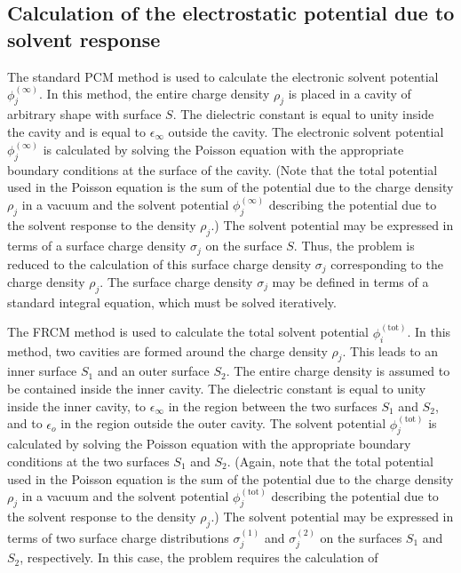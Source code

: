 \documentclass[oneside,11pt,openany]{book}
\begin{document}
\subsection*{Calculation of the electrostatic potential due to solvent response}
%
The standard PCM method is used to calculate the
electronic solvent potential $\phi_j^{(\infty)}$.
In this method,
the entire charge density $\rho_j$ is placed in a
cavity of arbitrary shape with surface $S$.
The dielectric
constant is equal to unity
inside the cavity and is equal to $\epsilon_\infty$
outside the cavity.
The electronic solvent potential $\phi_j^{(\infty)}$ is calculated by solving
the Poisson equation
with the appropriate boundary conditions at the surface of the
cavity.
(Note that the total potential used in the Poisson
equation is the sum of the potential
due to the charge density $\rho_j$ in a vacuum
and the solvent potential $\phi_j^{(\infty)}$ describing 
the potential due to the solvent response to the density $\rho_j$.)
The solvent potential 
may be expressed in terms of a surface charge density $\sigma_j$
on the surface $S$.  Thus, the problem is reduced to
the calculation of
this surface charge density $\sigma_j$ corresponding
to the charge density $\rho_j$.
The surface charge density $\sigma_j$ may be defined
in terms of a standard integral equation, which must
be solved iteratively.  
\par
The FRCM method is used to calculate the
total solvent potential $\phi_i^{\mathrm{(tot)}}$.
In this method,
two cavities are formed around the charge density $\rho_j$.  
This leads to an inner
surface $S_1$ and an outer surface $S_2$.
The entire charge density is assumed to be
contained inside the inner cavity.
The dielectric constant is equal to unity inside
the inner cavity, to $\epsilon_\infty$ in the
region between the two surfaces $S_1$ and $S_2$, and to $\epsilon_o$
in the region outside the outer cavity.
The solvent potential $\phi_j^{\mathrm{(tot)}}$ is calculated by solving
the Poisson equation
with the appropriate boundary conditions at the two surfaces
$S_1$ and $S_2$.
(Again, note that the total potential used in the Poisson
equation is the sum of the potential
due to the charge density $\rho_j$ in a vacuum
and the solvent potential $\phi_j^{\mathrm{(tot)}}$ describing 
the potential due to the solvent response to the density $\rho_j$.)
The solvent potential 
may be expressed in terms of two surface charge distributions
$\sigma_j^{(1)}$ and $\sigma_j^{(2)}$ on the surfaces $S_1$ and $S_2$, 
respectively.
In this case, the problem requires
the calculation of
\end{document}

